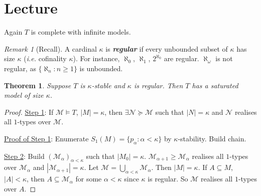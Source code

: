 \documentclass[]{article}
\theoremstyle{custhm}
\newtheorem{theorem}{Theorem}[section]
\theoremstyle{cusdef}
\theoremstyle{custhm}
\theoremstyle{custhm}
\theoremstyle{custhm}
\theoremstyle{ex}
\theoremstyle{custhm}
\theoremstyle{cusdef}
\theoremstyle{remark}
\newtheorem*{remark*}{Remark}
\theoremstyle{remark}
\theoremstyle{numremark}
\newcommand{\undf}[1]{\textit{\textbf{#1}}}
\renewcommand{\it}[1]{\textit{#1}}
\newcommand{\M}{\mathcal{M}}
\newcommand{\N}{\mathcal{N}}
\renewcommand{\subset}{\subseteq}
\begin{document}
\section{Lecture}

Again $T$ is complete with infinite models.

\begin{remark*}[Recall]
	A cardinal $\kappa$ is \undf{regular} if every unbounded subset of $\kappa$ has size $\kappa$ (\it{i.e.} cofinality $\kappa$). For instance, $\aleph_0$, $\aleph_1$, $2^{\aleph_0}$ are regular. $\aleph_\omega$ is not regular, as $\{\aleph_n:n\ge 1\}$ is unbounded.
\end{remark*}

\begin{theorem}
	Suppose $T$ is $\kappa$-stable and $\kappa$ is regular. Then $T$ has a saturated model of size $\kappa$.
\end{theorem}
\begin{proof}
	\underline{Step 1}: If $\M\models T$, $|M| = \kappa$, then $\exists \N \succeq \M$ such that $|N| = \kappa$ and $\N$ realises all $1$-types over $\M$.

	\underline{Proof of Step 1}: Enumerate $S_1(M) = \{p_\alpha:\alpha < \kappa\}$ by $\kappa$-stability. Build chain.

	\underline{Step 2}: Build $(\M_\alpha)_{\alpha < \kappa}$ such that $|M_0| = \kappa$. $\M_{\alpha+1}\ge \M_\alpha$ realises all $1$-types over $\M_\alpha$ and $|\M_{\alpha+1}| = \kappa$. Let $\M = \bigcup_{\alpha<\kappa} \M_\alpha$. Then $|M| = \kappa$. If $A\subset M$, $|A| <\kappa$, then $A\subset\M_\alpha$ for some $\alpha < \kappa$ since $\kappa$ is regular. So $\M$ realises all $1$-types over $A$.
\end{proof}
\end{document}
